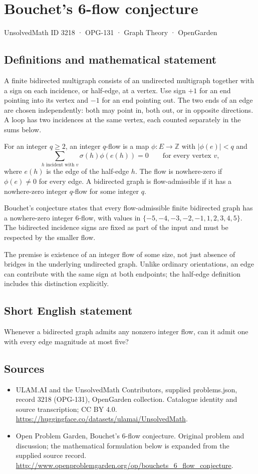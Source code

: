 \documentclass[11pt,a4paper]{article}
\begin{document}
\section*{Bouchet's 6-flow conjecture}\label{3218}
{\small UnsolvedMath ID 3218 · OPG-131 · Graph Theory · OpenGarden}
\subsection{Definitions and mathematical statement}
A finite bidirected multigraph consists
of an undirected multigraph together
with a sign on each incidence,
or half-edge, at a vertex. Use
sign $+1$ for an end pointing
into its vertex and $-1$ for
an end pointing out. The two
ends of an edge are chosen
independently: both may point in,
both out, or in opposite directions.
A loop has two incidences at
the same vertex, each counted
separately in the sums below.

For an integer $q\geq2$, an integer
$q$-flow is a map $\phi:E\to\mathbb Z$
with $|\phi(e)|<q$ and
\[
 \sum_{h\text{ incident with }v}
       \sigma(h)\phi(e(h))=0
 \qquad\text{for every vertex }v,
\]
where $e(h)$ is the edge of
the half-edge $h$. The flow
is nowhere-zero if $\phi(e)\neq0$
for every edge. A bidirected
graph is flow-admissible if it
has a nowhere-zero integer
$q$-flow for some integer $q$.

Bouchet's conjecture states that
every flow-admissible finite
bidirected graph has a nowhere-zero
integer $6$-flow, with values
in $\{-5,-4,-3,-2,-1,1,2,3,4,5\}$.
The bidirected incidence signs
are fixed as part of the
input and must be respected
by the smaller flow.

The premise is existence of
an integer flow of some size,
not just absence of bridges
in the underlying undirected
graph. Unlike ordinary orientations,
an edge can contribute with
the same sign at both endpoints;
the half-edge definition includes
this distinction explicitly.
\subsection{Short English statement}
Whenever a bidirected graph admits any nonzero integer flow, can it admit one with every edge magnitude at most five?
\subsection{Sources}
\begin{itemize}
\item[S1] ULAM.AI and the UnsolvedMath Contributors, supplied problems.json, record 3218 (OPG-131), OpenGarden collection. Catalogue identity and source transcription; CC BY 4.0.
\url{https://huggingface.co/datasets/ulamai/UnsolvedMath}.
\item[S2] Open Problem Garden, Bouchet's 6-flow conjecture. Original problem and discussion; the mathematical formulation below is expanded from the supplied source record.
\url{http://www.openproblemgarden.org/op/bouchets_6_flow_conjecture}.
\end{itemize}
\end{document}
